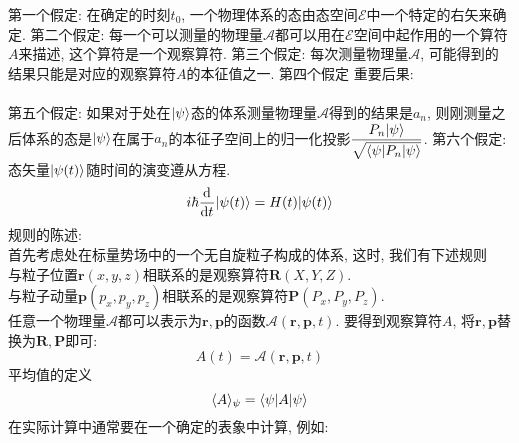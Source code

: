 \documentclass[UTF8]{ctexart}
\begin{document}
第一个假定: 在确定的时刻$t_0$, 一个物理体系的态由态空间$\mathscr{E}$中一个特定的右矢来确定. 
第二个假定: 每一个可以测量的物理量$\mathscr{A}$都可以用在$\mathscr{E}$空间中起作用的一个算符$A$来描述, 这个算符是一个观察算符. 
第三个假定: 每次测量物理量$\mathscr{A}$, 可能得到的结果只能是对应的观察算符$A$的本征值之一. 
第四个假定
重要后果:\\ \\
第五个假定: 如果对于处在$| {\psi} \rangle$态的体系测量物理量$\mathscr{A}$得到的结果是$a_n$, 则刚测量之后体系的态是$| {\psi} \rangle$在属于$a_n$的本征子空间上的归一化投影$\displaystyle \frac{P_n| {\psi} \rangle}{\sqrt{\langle {\psi|P_n|\psi} \rangle}}$.
第六个假定: 态矢量$| {\psi(t)} \rangle$随时间的演变遵从\sch 方程.
$$i\hbar\frac{\mathrm{d}^{} }{\mathrm{d} t^{}}| {\psi(t)} \rangle=H(t)| {\psi(t)} \rangle$$
规则的陈述: \\
首先考虑处在标量势场中的一个无自旋粒子构成的体系, 这时, 我们有下述规则\\
与粒子位置$\bm{r}(x,y,z)$相联系的是观察算符$\bm{R}(X,Y,Z)$. \\
与粒子动量$\bm{p}(p_x,p_y,p_z)$相联系的是观察算符$\bm{P}(P_x,P_y,P_z)$.\\
任意一个物理量$\mathscr{A}$都可以表示为$\bm{r},\bm{p}$的函数$\mathscr{A}(\bm{r},\bm{p},t)$. 要得到观察算符$A$, 将$\bm{r},\bm{p}$替换为$\bm{R},\bm{P}$即可: 
$$A(t)=\mathscr{A}(\bm{r},\bm{p},t)$$
平均值的定义
$$\langle {A} \rangle_\psi=\langle {\psi|A|\psi} \rangle$$
在实际计算中通常要在一个确定的表象中计算, 例如:
\end{document}
